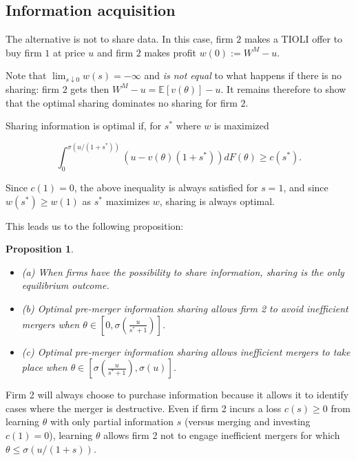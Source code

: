 \documentclass[a4paper,leqno]{article}%
\newtheorem{prop}{Proposition}
\newcommand{\E}{\mathbb E}
\renewcommand{\t}{\theta}
\newcommand{\s}{\sigma}
\begin{document}
\medskip

\subsection{Information acquisition}

The alternative is not to share data. In this case, firm $2$ makes a TIOLI offer to buy firm $1$ at price $u$ and firm $2$ makes profit $w(0):=W^M-u$.

\medskip

Note that $\lim_{s\downarrow 0}w(s)=-\infty$ and \emph{is not equal } to what happens if there is no sharing: firm $2$ gets then $W^M-u=\E[v(\t)]-u$. It remains therefore to show that the optimal sharing dominates no sharing for firm $2$. 

\medskip

Sharing information is optimal if, for $s^*$ where $w$ is maximized

\[
\int_{0}^{\s(u/(1+s^*))}(u-v(\t)(1+s^*))dF(\t)\geq c(s^*).
\]

Since $c(1)=0$, the above inequality is always satisfied for $s=1$, and since $w(s^*)\geq w(1)$ as $s^*$ maximizes $w$, sharing is always optimal.



This leads us to the following proposition:

\begin{prop}~~\label{prop:1}

\begin{itemize}
    \item (a) When firms have the possibility to share information, sharing is the only equilibrium outcome.
    \item (b) Optimal pre-merger information sharing allows firm 2 to avoid inefficient mergers when $\t\in\left[0,\s(\frac{u}{s^*+1})\right]$.
    \item (c) Optimal pre-merger information sharing allows inefficient mergers to take place when $\t\in\left[\s(\frac{u}{s^*+1}),\s(u)\right]$.
\end{itemize} 

\end{prop}

\medskip

Firm 2 will always choose to purchase information because it allows it to identify cases where the merger is destructive. Even if firm 2 incurs a loss $c(s)\geq 0$ from learning $\t$ with only partial information $s$ (versus merging and investing $c(1)=0$), learning $\t$ allows firm 2 not to engage inefficient mergers for which $\t\leq \s(u/(1+s))$. 
\end{document}
